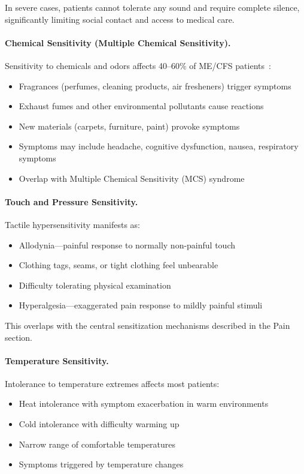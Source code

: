 In severe cases, patients cannot tolerate any sound and require complete silence, significantly limiting social contact and access to medical care.

\paragraph{Chemical Sensitivity (Multiple Chemical Sensitivity).}
Sensitivity to chemicals and odors affects 40--60\% of ME/CFS patients~\cite{Jason2013sensory}:
\begin{itemize}
    \item Fragrances (perfumes, cleaning products, air fresheners) trigger symptoms
    \item Exhaust fumes and other environmental pollutants cause reactions
    \item New materials (carpets, furniture, paint) provoke symptoms
    \item Symptoms may include headache, cognitive dysfunction, nausea, respiratory symptoms
    \item Overlap with Multiple Chemical Sensitivity (MCS) syndrome
\end{itemize}

\paragraph{Touch and Pressure Sensitivity.}
Tactile hypersensitivity manifests as:
\begin{itemize}
    \item Allodynia---painful response to normally non-painful touch
    \item Clothing tags, seams, or tight clothing feel unbearable
    \item Difficulty tolerating physical examination
    \item Hyperalgesia---exaggerated pain response to mildly painful stimuli
\end{itemize}

This overlaps with the central sensitization mechanisms described in the Pain section.

\paragraph{Temperature Sensitivity.}
Intolerance to temperature extremes affects most patients:
\begin{itemize}
    \item Heat intolerance with symptom exacerbation in warm environments
    \item Cold intolerance with difficulty warming up
    \item Narrow range of comfortable temperatures
    \item Symptoms triggered by temperature changes
\end{itemize}

